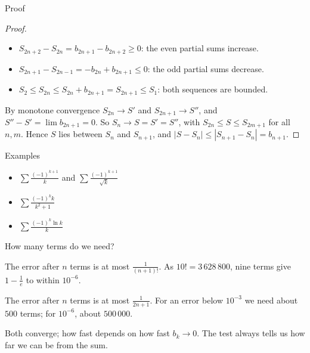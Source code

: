 \documentclass{wosm-slides}
\begin{document}
\begin{frame}{Proof}
  \begin{proof}
    \begin{itemize}
      \item $S_{2n+2} - S_{2n} = b_{2n+1} - b_{2n+2} \ge 0$: the even partial sums increase.
      \item $S_{2n+1} - S_{2n-1} = -b_{2n} + b_{2n+1} \le 0$: the odd partial sums decrease.
      \item $S_2 \le S_{2n} \le S_{2n} + b_{2n+1} = S_{2n+1} \le S_1$:
        both sequences are bounded.
    \end{itemize}
    By monotone convergence $S_{2n} \to S'$ and $S_{2n+1} \to S''$, and
    $S'' - S' = \lim b_{2n+1} = 0$. So $S_n \to S = S' = S''$, with
    $S_{2n} \le S \le S_{2m+1}$ for all $n, m$.
    Hence $S$ lies between $S_n$ and $S_{n+1}$, and $|S - S_n| \le |S_{n+1} - S_n| = b_{n+1}$.
  \end{proof}
\end{frame}

\begin{frame}{Examples}
  \begin{itemize}
    \item $\displaystyle\sum \frac{(-1)^{k+1}}{k}$ and $\displaystyle\sum \frac{(-1)^{k+1}}{\sqrt k}$
    \item $\displaystyle\sum \frac{(-1)^k k}{k^2 + 1}$
    \item $\displaystyle\sum \frac{(-1)^k \ln k}{k}$
  \end{itemize}
\end{frame}

\begin{frame}{How many terms do we need?}
  \begin{example}[$\sum_{k=1}^\infty \frac{(-1)^{k+1}}{k!} = 1 - \frac1e$ \ (Unit 5)]
    The error after $n$ terms is at most $\frac{1}{(n+1)!}$. As $10! = 3\,628\,800$,
    nine terms give $1 - \frac1e$ to within $10^{-6}$.
  \end{example}
  \pause
  \begin{example}[$1 - \frac13 + \frac15 - \frac17 + \cdots = \frac{\pi}{4}$ \ (Unit 6)]
    The error after $n$ terms is at most $\frac{1}{2n+1}$. For an error below $10^{-3}$
    we need about $500$ terms; for $10^{-6}$, about $500\,000$.
  \end{example}
  \pause
  Both converge; how fast depends on how fast $b_k \to 0$.
  The test always tells us how far we can be from the sum.
\end{frame}
\end{document}
